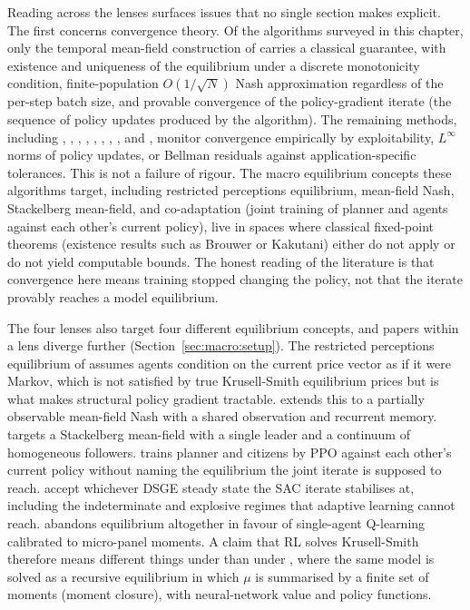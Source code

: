 Reading across the lenses surfaces issues that no single section
makes explicit. The first concerns convergence theory. Of the
algorithms surveyed in this chapter, only the temporal mean-field
construction of \citet{YangShan2026tmf} carries a classical
guarantee, with existence and uniqueness of the equilibrium under a
discrete monotonicity condition, finite-population
$O(1/\sqrt{N})$ Nash approximation regardless of the per-step batch
size, and provable convergence of the policy-gradient iterate (the
sequence of policy updates produced by the algorithm). The
remaining methods, including \citet{Yang2025srl},
\citet{Wibault2026rspg}, \citet{Kaplowitz2025},
\citet{Zheng2022aie}, \citet{Chen2021drl}, \citet{Mi2025dsmfg},
\citet{Han2022deepham}, \citet{Brunnbauer2024offmmd}, and
\citet{Magnino2025nonstationary}, monitor convergence empirically by
exploitability, $L^{\infty}$ norms of policy updates, or Bellman
residuals against application-specific tolerances. This is not a
failure of rigour. The macro equilibrium concepts these algorithms
target, including restricted perceptions equilibrium, mean-field
Nash, Stackelberg mean-field, and co-adaptation (joint training of
planner and agents against each other's current policy), live in
spaces where classical fixed-point theorems (existence results such
as Brouwer or Kakutani) either do not apply or do not
yield computable bounds. The honest reading of the literature is
that convergence here means training stopped changing the policy,
not that the iterate provably reaches a model equilibrium.

The four lenses also target four different equilibrium concepts,
and papers within a lens diverge further
(Section~\ref{sec:macro:setup}). The restricted perceptions
equilibrium of \citet{Yang2025srl} assumes agents condition on the
current price vector as if it were Markov, which is not satisfied by
true Krusell-Smith equilibrium prices but is what makes structural
policy gradient tractable. \citet{Wibault2026rspg} extends this to a
partially observable mean-field Nash with a shared observation and
recurrent memory. \citet{Mi2025dsmfg} targets a Stackelberg
mean-field with a single leader and a continuum of homogeneous
followers. \citet{Zheng2022aie} trains planner and citizens by PPO
against each other's current policy without naming the equilibrium
the joint iterate is supposed to reach. \citet{Chen2021drl} accept
whichever DSGE steady state the SAC iterate stabilises at, including
the indeterminate and explosive regimes that adaptive learning
cannot reach. \citet{Kaplowitz2025} abandons equilibrium altogether
in favour of single-agent Q-learning calibrated to micro-panel
moments. A claim that RL solves Krusell-Smith therefore means
different things under \citet{Yang2025srl} than under
\citet{Han2022deepham}, where the same model is solved as a
recursive equilibrium in which $\mu$ is summarised by a finite set
of moments (moment closure), with neural-network value and policy
functions.

